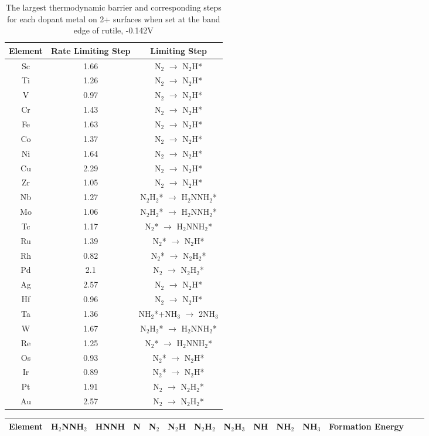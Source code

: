 \documentclass{article}
\begin{document}
\begin{table}
\begin{center}
\begin{tabular}{| c | c |c |}
\hline
Element & Rate Limiting Step & Limiting Step \\
\hline
Sc & 1.66 & N$_2$ $\rightarrow$ N$_2$H*\\
Ti & 1.26 & N$_2$ $\rightarrow$ N$_2$H*\\
V & 0.97 & N$_2$ $\rightarrow$ N$_2$H*\\
Cr & 1.43 & N$_2$ $\rightarrow$ N$_2$H*\\
Fe & 1.63 & N$_2$ $\rightarrow$ N$_2$H*\\
Co & 1.37 & N$_2$ $\rightarrow$ N$_2$H*\\
Ni & 1.64 & N$_2$ $\rightarrow$ N$_2$H*\\
Cu & 2.29 & N$_2$ $\rightarrow$ N$_2$H*\\
Zr & 1.05 & N$_2$ $\rightarrow$ N$_2$H*\\
Nb & 1.27 & N$_2$H$_2$* $\rightarrow$ H$_2$NNH$_2$*\\
Mo & 1.06 & N$_2$H$_2$* $\rightarrow$ H$_2$NNH$_2$*\\
Tc & 1.17 & N$_2$* $\rightarrow$ H$_2$NNH$_2$*\\
Ru & 1.39 & N$_2$* $\rightarrow$ N$_2$H*\\
Rh & 0.82 & N$_2$* $\rightarrow$ N$_2$H$_2$*\\
Pd & 2.1 & N$_2$ $\rightarrow$ N$_2$H$_2$*\\
Ag & 2.57 & N$_2$ $\rightarrow$ N$_2$H*\\
Hf & 0.96 & N$_2$ $\rightarrow$ N$_2$H*\\
Ta & 1.36 & NH$_2$*+NH$_3$ $\rightarrow$ 2NH$_3$\\
W & 1.67 & N$_2$H$_2$* $\rightarrow$ H$_2$NNH$_2$*\\
Re & 1.25 & N$_2$* $\rightarrow$ H$_2$NNH$_2$*\\
Os & 0.93 & N$_2$* $\rightarrow$ N$_2$H*\\
Ir & 0.89 & N$_2$* $\rightarrow$ N$_2$H*\\
Pt & 1.91 & N$_2$ $\rightarrow$ N$_2$H$_2$*\\
Au & 2.57 & N$_2$ $\rightarrow$ N$_2$H$_2$*\\
\hline
\end{tabular}
\end{center}
\caption{The largest thermodynamic barrier and corresponding steps for each dopant metal on 2+ surfaces when set at the band edge of rutile, -0.142V}\label{table:rate_limiting_steps}\end{table}\begin{table}
\setlength\tabcolsep{2pt}
\begin{center}
\begin{tabular}{| c | c | c | c | c | c | c | c | c | c | c | c | c | c |}
\hline
Element & H$_2$NNH$_2$ & HNNH & N & N$_2$ & N$_2$H & N$_2$H$_2$ & N$_2$H$_3$ & NH & NH$_2$ & NH$_3$ & Formation Energy\\
\hline


\end{tabular}
\end{center}
\end{table}
\end{document}
